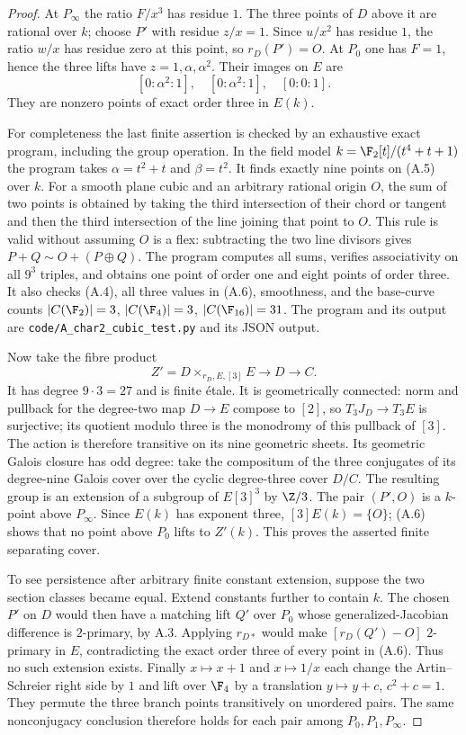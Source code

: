 \begin{proof}
At $P_\infty$ the ratio $F/x^3$ has residue $1$. The three
points of $D$ above it are rational over $k$; choose $P'$ with
residue $z/x=1$. Since $u/x^2$ has residue $1$, the ratio
$w/x$ has residue zero at this point, so $r_D(P')=O$.
At $P_0$ one has $F=1$, hence the three lifts have
$z=1,\alpha,\alpha^2$. Their images on $E$ are
\[
 [0:\alpha^2:1],\quad[0:\alpha^2:1],\quad[0:0:1].              \tag{A.6}
\]
They are nonzero points of exact order three in $E(k)$.

For completeness the last finite assertion is checked by an
exhaustive exact program, including the group operation. In the
field model $k=\F_2[t]/(t^4+t+1)$ the program takes
$\alpha=t^2+t$ and $\beta=t^2$. It finds exactly nine points on
(A.5) over $k$. For a smooth plane cubic and an arbitrary rational
origin $O$, the sum of two points is obtained by taking the third
intersection of their chord or tangent and then the third
intersection of the line joining that point to $O$.
This rule is valid without assuming $O$ is a flex: subtracting the
two line divisors gives $P+Q\sim O+(P\oplus Q)$.
The program computes all sums, verifies associativity on all
$9^3$ triples, and obtains one point of order one and eight
points of order three. It also checks (A.4), all three values
in (A.6), smoothness, and the base-curve counts
$|C(\F_2)|=3$, $|C(\F_4)|=3$, $|C(\F_{16})|=31$.
The program and its output are
\texttt{code/A\_char2\_cubic\_test.py} and its JSON output.

Now take the fibre product
\[
 Z'=D\times_{r_D,E,[3]}E\longrightarrow D\longrightarrow C.
\]
It has degree $9\cdot3=27$ and is finite \'etale.
It is geometrically connected: norm and pullback for the
degree-two map $D\to E$ compose to $[2]$, so
$T_3J_D\to T_3E$ is surjective; its quotient modulo three is
the monodromy of this pullback of $[3]$. The action is therefore
transitive on its nine geometric sheets.
Its geometric Galois closure has odd degree: take the compositum
of the three conjugates of its degree-nine Galois cover over
the cyclic degree-three cover $D/C$. The resulting group is an
extension of a subgroup of $E[3]^3$ by $\Z/3$.
The pair $(P',O)$ is a $k$-point above $P_\infty$.
Since $E(k)$ has exponent three, $[3]E(k)=\{O\}$; (A.6)
shows that no point above $P_0$ lifts to $Z'(k)$. This proves
the asserted finite separating cover.

To see persistence after arbitrary finite constant extension,
suppose the two section classes became equal. Extend constants
further to contain $k$. The chosen $P'$ on $D$ would then have
a matching lift $Q'$ over $P_0$ whose generalized-Jacobian
difference is $2$-primary, by A.3. Applying $r_{D*}$ would make
$[r_D(Q')-O]$ $2$-primary in $E$, contradicting the exact order
three of every point in (A.6). Thus no such extension exists.
Finally $x\mapsto x+1$ and $x\mapsto1/x$ each change the
Artin--Schreier right side by $1$ and lift over $\F_4$ by a
translation $y\mapsto y+c$, $c^2+c=1$. They permute the three
branch points transitively on unordered pairs. The same
nonconjugacy conclusion therefore holds for each pair among
$P_0,P_1,P_\infty$.
\end{proof}

